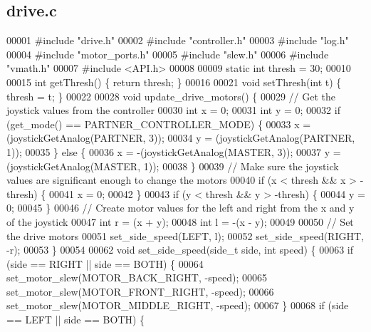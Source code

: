 \subsection{drive.\+c}
\label{a00092_source}

\begin{DoxyCode}
00001 \textcolor{preprocessor}{#include "drive.h"}
00002 \textcolor{preprocessor}{#include "controller.h"}
00003 \textcolor{preprocessor}{#include "log.h"}
00004 \textcolor{preprocessor}{#include "motor_ports.h"}
00005 \textcolor{preprocessor}{#include "slew.h"}
00006 \textcolor{preprocessor}{#include "vmath.h"}
00007 \textcolor{preprocessor}{#include <API.h>}
00008 
00009 \textcolor{keyword}{static} \textcolor{keywordtype}{int} thresh = 30;
00010 
00015 \textcolor{keywordtype}{int} getThresh() \{ \textcolor{keywordflow}{return} thresh; \}
00016 
00021 \textcolor{keywordtype}{void} setThresh(\textcolor{keywordtype}{int} t) \{ thresh = t; \}
00022 
00028 \textcolor{keywordtype}{void} update_drive_motors() \{
00029   \textcolor{comment}{// Get the joystick values from the controller}
00030   \textcolor{keywordtype}{int} x = 0;
00031   \textcolor{keywordtype}{int} y = 0;
00032   \textcolor{keywordflow}{if} (get_mode() == PARTNER_CONTROLLER_MODE) \{
00033     x = (joystickGetAnalog(PARTNER, 3));
00034     y = (joystickGetAnalog(PARTNER, 1));
00035   \} \textcolor{keywordflow}{else} \{
00036     x = -(joystickGetAnalog(MASTER, 3));
00037     y = (joystickGetAnalog(MASTER, 1));
00038   \}
00039   \textcolor{comment}{// Make sure the joystick values are significant enough to change the motors}
00040   \textcolor{keywordflow}{if} (x < thresh && x > -thresh) \{
00041     x = 0;
00042   \}
00043   \textcolor{keywordflow}{if} (y < thresh && y > -thresh) \{
00044     y = 0;
00045   \}
00046   \textcolor{comment}{// Create motor values for the left and right from the x and y of the joystick}
00047   \textcolor{keywordtype}{int} r = (x + y);
00048   \textcolor{keywordtype}{int} l = -(x - y);
00049 
00050   \textcolor{comment}{// Set the drive motors}
00051   set_side_speed(LEFT, l);
00052   set_side_speed(RIGHT, -r);
00053 \}
00054 
00062 \textcolor{keywordtype}{void} set_side_speed(side_t side, \textcolor{keywordtype}{int} speed) \{
00063   \textcolor{keywordflow}{if} (side == RIGHT || side == BOTH) \{
00064     set_motor_slew(MOTOR_BACK_RIGHT, -speed);
00065     set_motor_slew(MOTOR_FRONT_RIGHT, -speed);
00066     set_motor_slew(MOTOR_MIDDLE_RIGHT, -speed);
00067   \}
00068   \textcolor{keywordflow}{if} (side == LEFT || side == BOTH) \{

\end{DoxyCode}
